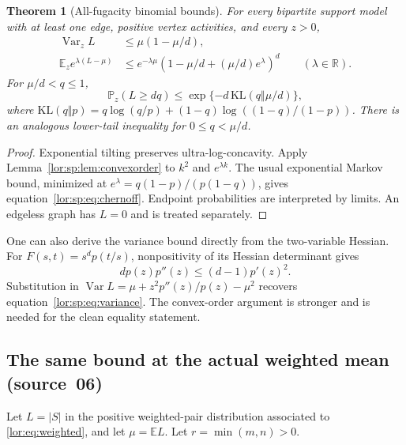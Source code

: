 \documentclass[11pt]{article}
\numberwithin{equation}{section}
\newtheorem{theorem}{Theorem}[section]
\theoremstyle{definition}
\newcommand{\R}{\mathbb R}
\newcommand{\Var}{\operatorname{Var}}
\newcommand{\EE}{\mathbb E}
\newcommand{\PP}{\mathbb P}
\begin{document}
\begin{theorem}[All-fugacity binomial bounds]
\label{lor:sp:thm:probability}
For every bipartite support model with at least one edge, positive vertex
activities, and every $z>0$,
\begin{align}
 \Var_z L&\le\mu(1-\mu/d),\label{lor:sp:eq:variance}\\
 \EE_z e^{\lambda(L-\mu)}
 &\le e^{-\lambda\mu}
       (1-\mu/d+(\mu/d)e^\lambda)^d
       \qquad(\lambda\in\R).\label{lor:sp:eq:mgf}
\end{align}
For $\mu/d<q\le1$,
\begin{equation}
 \PP_z(L\ge dq)\le
 \exp\{-d\,\mathrm{KL}(q\Vert\mu/d)\},
 \label{lor:sp:eq:chernoff}
\end{equation}
where $\mathrm{KL}(q\Vert p)=q\log(q/p)+(1-q)\log((1-q)/(1-p))$.
There is an analogous lower-tail inequality for $0\le q<\mu/d$.
\end{theorem}
\begin{proof}
Exponential tilting preserves ultra-log-concavity. Apply
Lemma~\ref{lor:sp:lem:convexorder} to $k^2$ and $e^{\lambda k}$. The usual exponential
Markov bound, minimized at
$e^\lambda=q(1-p)/(p(1-q))$, gives equation~\eqref{lor:sp:eq:chernoff}. Endpoint probabilities
are interpreted by limits. An edgeless graph has $L=0$ and is treated separately.
\end{proof}

One can also derive the variance bound directly from the two-variable Hessian.
For $F(s,t)=s^dp(t/s)$, nonpositivity of its Hessian determinant gives
\[
 dp(z)p''(z)\le(d-1)p'(z)^2.
\]
Substitution in
$\Var L=\mu+z^2p''(z)/p(z)-\mu^2$
recovers equation~\eqref{lor:sp:eq:variance}. The convex-order argument is stronger and is
needed for the clean equality statement.


\subsection{The same bound at the actual weighted mean (source~06)}
Let $L=|S|$ in the positive weighted-pair distribution associated to
\eqref{lor:eq:weighted}, and let $\mu=\EE L$. Let $r=\min(m,n)>0$.
\end{document}
